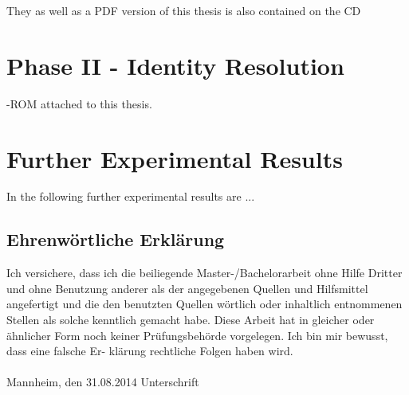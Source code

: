 \documentclass[11pt,titlepage,oneside,openany]{book}
\begin{document}
They as well as a PDF version of this thesis is also contained on the CD\chapter{Phase II - Identity Resolution}
\label{cha:intro}-ROM attached to this thesis.

\chapter{Further Experimental Results}
\label{cha:appendix-b}

In the following further experimental results are ...


\newpage


\pagestyle{empty}


\section*{Ehrenw\"ortliche Erkl\"arung}
Ich versichere, dass ich die beiliegende Master-/Bachelorarbeit ohne Hilfe Dritter
und ohne Benutzung anderer als der angegebenen Quellen und Hilfsmittel
angefertigt und die den benutzten Quellen w\"ortlich oder inhaltlich
entnommenen Stellen als solche kenntlich gemacht habe. Diese Arbeit
hat in gleicher oder \"ahnlicher Form noch keiner Pr\"ufungsbeh\"orde
vorgelegen. Ich bin mir bewusst, dass eine falsche Er- kl\"arung rechtliche Folgen haben
wird.
\\
\\

\noindent
Mannheim, den 31.08.2014 \hspace{4cm} Unterschrift
\end{document}
